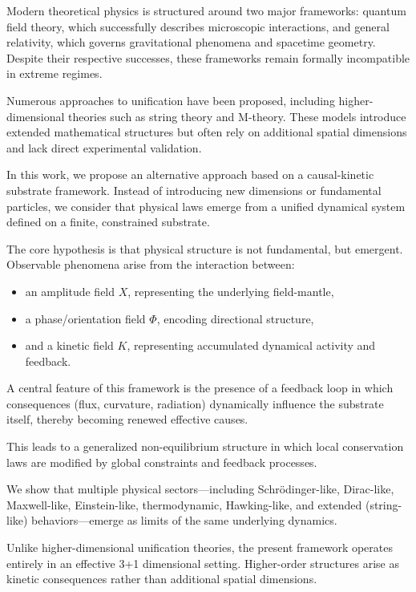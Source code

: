 \documentclass[11pt]{article}
\begin{document}
Modern theoretical physics is structured around two major frameworks: quantum field theory, which successfully describes microscopic interactions, and general relativity, which governs gravitational phenomena and spacetime geometry. Despite their respective successes, these frameworks remain formally incompatible in extreme regimes.

Numerous approaches to unification have been proposed, including higher-dimensional theories such as string theory and M-theory. These models introduce extended mathematical structures but often rely on additional spatial dimensions and lack direct experimental validation.

In this work, we propose an alternative approach based on a causal-kinetic substrate framework. Instead of introducing new dimensions or fundamental particles, we consider that physical laws emerge from a unified dynamical system defined on a finite, constrained substrate.

The core hypothesis is that physical structure is not fundamental, but emergent. Observable phenomena arise from the interaction between:
\begin{itemize}
\item an amplitude field $X$, representing the underlying field-mantle,
\item a phase/orientation field $\Phi$, encoding directional structure,
\item and a kinetic field $K$, representing accumulated dynamical activity and feedback.
\end{itemize}

A central feature of this framework is the presence of a feedback loop in which consequences (flux, curvature, radiation) dynamically influence the substrate itself, thereby becoming renewed effective causes.

This leads to a generalized non-equilibrium structure in which local conservation laws are modified by global constraints and feedback processes.

We show that multiple physical sectors—including Schrödinger-like, Dirac-like, Maxwell-like, Einstein-like, thermodynamic, Hawking-like, and extended (string-like) behaviors—emerge as limits of the same underlying dynamics.

Unlike higher-dimensional unification theories, the present framework operates entirely in an effective 3+1 dimensional setting. Higher-order structures arise as kinetic consequences rather than additional spatial dimensions.
\end{document}
